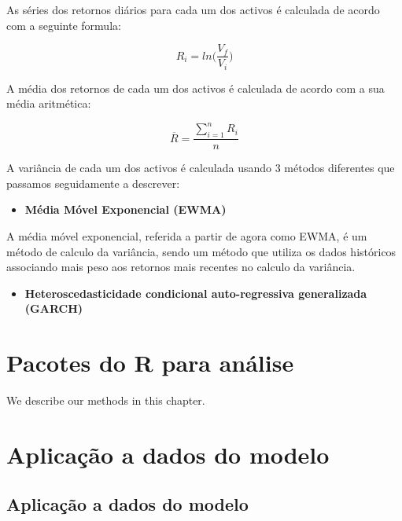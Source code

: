 \documentclass[
  12pt,
  a4paper,
  openany]{book}
\providecommand{\tightlist}{%
  \setlength{\itemsep}{0pt}\setlength{\parskip}{0pt}}
\begin{document}
As séries dos retornos diários para cada um dos activos é calculada de acordo com a seguinte formula:

\begin{equation} 
  R_i = ln\Big(\frac{V_f}{V_i}\Big)
  \label{eq:log}
\end{equation}

A média dos retornos de cada um dos activos é calculada de acordo com a sua média aritmética:

\begin{equation} 
  \overline{R} = \frac{\displaystyle\sum_{i=1}^n R_i}{n}
  \label{eq:mean}
\end{equation}

A variância de cada um dos activos é calculada usando 3 métodos diferentes que passamos seguidamente a descrever:

\begin{itemize}
\tightlist
\item
  \textbf{Média Móvel Exponencial (EWMA)}
\end{itemize}

A média móvel exponencial, referida a partir de agora como EWMA, é um método de calculo da variância, sendo um método que utiliza os dados históricos associando mais peso aos retornos mais recentes no calculo da variância.

\begin{itemize}
\tightlist
\item
  \textbf{Heteroscedasticidade condicional auto-regressiva generalizada (GARCH)}
\end{itemize}

\hypertarget{pacotes-do-r-para-anuxe1lise}{%
\chapter{Pacotes do R para análise}\label{pacotes-do-r-para-anuxe1lise}}

\newpage

We describe our methods in this chapter.

\hypertarget{aplicauxe7uxe3o-a-dados-do-modelo}{%
\chapter{Aplicação a dados do modelo}\label{aplicauxe7uxe3o-a-dados-do-modelo}}

\endgroup
\newpage

\hypertarget{aplicauxe7uxe3o-a-dados-do-modelo-1}{%
\section{Aplicação a dados do modelo}\label{aplicauxe7uxe3o-a-dados-do-modelo-1}}
\end{document}
